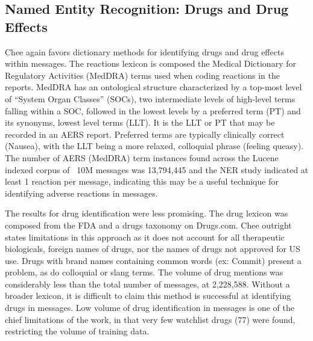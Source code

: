 \documentclass[twoside,11pt]{article}
\begin{document}
\subsection{Named Entity Recognition: Drugs and Drug Effects}
Chee again favors dictionary methods for identifying drugs and drug effects within messages. The reactions lexicon is composed the Medical Dictionary for Regulatory Activities (MedDRA) terms used when coding reactions in the reports. MedDRA has an ontological structure characterized by a top-most level of ``System Organ Classes'' (SOCs), two intermediate levels of high-level terms falling within a SOC, followed in the lowest levels by a preferred term (PT) and its synonyms, lowest level terms (LLT). It is the LLT or PT that may be recorded in an AERS report. Preferred terms are typically clinically correct (Nausea), with the LLT being a more relaxed, colloquial phrase (feeling queasy). The number of AERS (MedDRA) term instances found across the Lucene indexed corpus of ~10M messages was 13,794,445 and the NER study indicated at least 1 reaction per message, indicating this may be a useful technique for identifying adverse reactions in messages.
\par The results for drug identification were less promising.  The drug lexicon was composed from the FDA and a drugs taxonomy on Drugs.com. Chee outright states limitations in this approach as it does not account for all therapeutic biologicals, foreign names of drugs, nor the names of drugs not approved for US use. Drugs with brand names containing common words (ex: Commit) present a problem, as do colloquial or slang terms. The volume of drug mentions was considerably less than the total number of messages, at 2,228,588. Without a broader lexicon, it is difficult to claim this method is successful at identifying drugs in messages. Low volume of drug identification in messages is one of the chief limitations of the work, in that very few watchlist drugs (77) were found, restricting the volume of training data.
\end{document}
